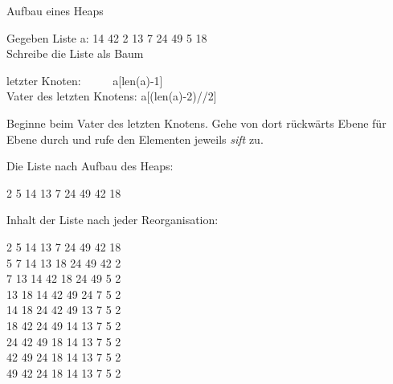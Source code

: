\documentclass{beamer}
\begin{document}
\begin{frame}[fragile]
Aufbau eines Heaps  

Gegeben Liste a:  14 42 2 13 7 24 49 5 18 \\
Schreibe die Liste als Baum  

 \pause 


letzter Knoten: ~~~~~\pause a[len(a)-1] \\ \pause 
Vater des letzten Knotens: \pause a[(len(a)-2)//2] \pause 

Beginne beim Vater des letzten Knotens. Gehe von dort rückwärts Ebene für Ebene durch und rufe den Elementen jeweils \textit{sift} zu.
\end{frame}

\begin{frame}[fragile]


Die Liste nach Aufbau des Heaps:

2 5 14 13 7 24 49 42 18
\end{frame}

 
\begin{frame}[fragile]
Inhalt der Liste nach jeder Reorganisation:

2 5 14 13 7 24 49 42 18 \\
5 7 14 13 18 24 49 42 \alert{2} \\
7 13 14 42 18 24 49 \alert{5 2} \\
13 18 14 42 49 24  \alert{7 5 2} \\
14 18 24 42 49 \alert{13 7 5 2 \\}
18 42 24 49 \alert{14 13 7 5 2 \\}
24 42 49 \alert{18 14 13 7 5 2 \\}
42 49 \alert{24 18 14 13 7 5 2 \\}
49 \alert{42 24 18 14 13 7 5 2 \\}

\end{frame}
\end{document}
